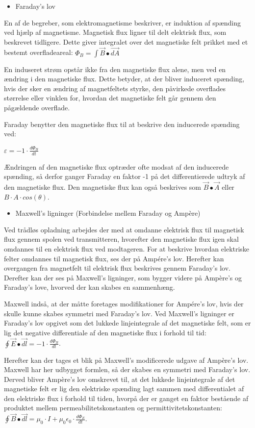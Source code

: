\begin{itemize}
\item Faraday's lov
\end{itemize}
En af de begreber, som elektromagnetisme beskriver, er induktion af spænding ved hjælp af magnetisme. Magnetisk flux ligner til delt elektrisk flux, som beskrevet tidligere. Dette giver integralet over det magnetiske felt prikket med et bestemt overfladeareal: $\Phi_B = \int \vec{B} \bullet \vec{dA}$

En induseret strøm opstår ikke fra den magnetiske flux alene, men ved en ændring i den magnetiske flux. Dette betyder, at der bliver induceret spænding, hvis der sker en ændring af magnetfeltets styrke, den påvirkede overflades størrelse eller vinklen for, hvordan det magnetiske felt går gennem den pågældende overflade.

Faraday benytter den magnetiske flux til at beskrive den inducerede spænding ved:

\centerline{$\varepsilon = -1 \cdot \frac{d \Phi_B}{dt}$}

Ændringen af den magnetiske flux optræder ofte modsat af den inducerede spænding, så derfor ganger Faraday en faktor -1 på det differentierede udtryk af den magnetiske flux. Den magnetiske flux kan også beskrives som $\vec{B} \bullet \vec{A}$ eller $B \cdot A \cdot cos(\theta)$.
\begin{itemize}
\item Maxwell's ligninger (Forbindelse mellem Faraday og Ampère)
\end{itemize}
Ved trådløs opladning arbejdes der med at omdanne elektrisk flux til magnetisk flux gennem spolen ved transmitteren, hvorefter den magnetiske flux igen skal omdannes til en elektrisk flux ved modtageren. For at beskrive hvordan elektriske felter omdannes til magnetisk flux, ses der på Ampére's lov. Herefter kan overgangen fra magnetfelt til elektrisk flux beskrives gennem Faraday's lov. Derefter kan der ses på Maxwell's ligninger, som bygger videre på Ampère's og Faraday's love, hvorved der kan skabes en sammenhæng.

Maxwell indså, at der måtte foretages modifikationer for Ampére's lov, hvis der skulle kunne skabes symmetri med Faraday's lov. Ved Maxwell's ligninger er Faraday's lov opgivet som det lukkede linjeintegrale af det magnetiske felt, som er lig det negative differentiale af den magnetiske flux i forhold til tid: $\oint \vec{E} \bullet \vec{dl} = -1 \cdot \frac{d \Phi_B}{dt}$.

Herefter kan der tages et blik på Maxwell's modificerede udgave af Ampère's lov. Maxwell har her udbygget formlen, så der skabes en symmetri med Faraday's lov. Derved bliver Ampère's lov omskrevet til, at det lukkede linjeintegrale af det magnetiske felt er lig den elektriske spænding lagt sammen med differentialet af den elektriske flux i forhold til tiden, hvorpå der er ganget en faktor bestående af produktet mellem permeabilitetskonstanten og permittivitetskonstanten: $\oint \vec{B} \bullet \vec{dl} = \mu_0 \cdot I + \mu_0 \epsilon_0 \cdot \frac{d \Phi_E}{dt}$.

